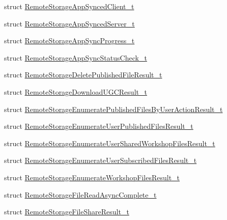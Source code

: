 \begin{DoxyCompactItemize}
\item 
struct \hyperlink{struct_valve_1_1_steamworks_1_1_remote_storage_app_synced_client__t}{Remote\+Storage\+App\+Synced\+Client\+\_\+t}
\item 
struct \hyperlink{struct_valve_1_1_steamworks_1_1_remote_storage_app_synced_server__t}{Remote\+Storage\+App\+Synced\+Server\+\_\+t}
\item 
struct \hyperlink{struct_valve_1_1_steamworks_1_1_remote_storage_app_sync_progress__t}{Remote\+Storage\+App\+Sync\+Progress\+\_\+t}
\item 
struct \hyperlink{struct_valve_1_1_steamworks_1_1_remote_storage_app_sync_status_check__t}{Remote\+Storage\+App\+Sync\+Status\+Check\+\_\+t}
\item 
struct \hyperlink{struct_valve_1_1_steamworks_1_1_remote_storage_delete_published_file_result__t}{Remote\+Storage\+Delete\+Published\+File\+Result\+\_\+t}
\item 
struct \hyperlink{struct_valve_1_1_steamworks_1_1_remote_storage_download_u_g_c_result__t}{Remote\+Storage\+Download\+U\+G\+C\+Result\+\_\+t}
\item 
struct \hyperlink{struct_valve_1_1_steamworks_1_1_remote_storage_enumerate_published_files_by_user_action_result__t}{Remote\+Storage\+Enumerate\+Published\+Files\+By\+User\+Action\+Result\+\_\+t}
\item 
struct \hyperlink{struct_valve_1_1_steamworks_1_1_remote_storage_enumerate_user_published_files_result__t}{Remote\+Storage\+Enumerate\+User\+Published\+Files\+Result\+\_\+t}
\item 
struct \hyperlink{struct_valve_1_1_steamworks_1_1_remote_storage_enumerate_user_shared_workshop_files_result__t}{Remote\+Storage\+Enumerate\+User\+Shared\+Workshop\+Files\+Result\+\_\+t}
\item 
struct \hyperlink{struct_valve_1_1_steamworks_1_1_remote_storage_enumerate_user_subscribed_files_result__t}{Remote\+Storage\+Enumerate\+User\+Subscribed\+Files\+Result\+\_\+t}
\item 
struct \hyperlink{struct_valve_1_1_steamworks_1_1_remote_storage_enumerate_workshop_files_result__t}{Remote\+Storage\+Enumerate\+Workshop\+Files\+Result\+\_\+t}
\item 
struct \hyperlink{struct_valve_1_1_steamworks_1_1_remote_storage_file_read_async_complete__t}{Remote\+Storage\+File\+Read\+Async\+Complete\+\_\+t}
\item 
struct \hyperlink{struct_valve_1_1_steamworks_1_1_remote_storage_file_share_result__t}{Remote\+Storage\+File\+Share\+Result\+\_\+t}

\end{DoxyCompactItemize}

